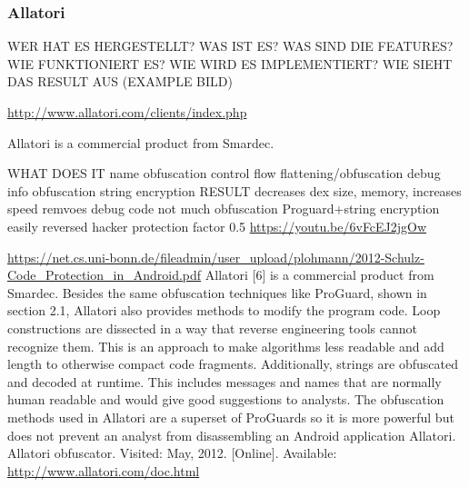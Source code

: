 \subsubsection{Allatori} \label{subsubsection:counter-reengineering-optobf-allatori}

WER HAT ES HERGESTELLT? WAS IST ES? WAS SIND DIE FEATURES? WIE FUNKTIONIERT ES? WIE WIRD ES IMPLEMENTIERT? WIE SIEHT DAS RESULT AUS (EXAMPLE BILD)\newline

\url{http://www.allatori.com/clients/index.php}\newline

Allatori is a commercial product from Smardec.

WHAT DOES IT\newline
name obfuscation\newline
control flow flattening/obfuscation\newline
debug info obfuscation\newline
string encryption\newline
RESULT\newline
decreases dex size, memory, increases speed\newline
remvoes debug code\newline
not much obfuscation\newline
Proguard+string encryption\newline
easily reversed\newline
hacker protection factor 0.5\newline
\url{https://youtu.be/6vFcEJ2jgOw}


\url{https://net.cs.uni-bonn.de/fileadmin/user_upload/plohmann/2012-Schulz-Code_Protection_in_Android.pdf}\newline
Allatori [6] is a commercial product from Smardec. Besides the same obfuscation techniques
like ProGuard, shown in section 2.1, Allatori also provides methods to modify the
program code. Loop constructions are dissected in a way that reverse engineering tools
cannot recognize them. This is an approach to make algorithms less readable and add
length to otherwise compact code fragments. Additionally, strings are obfuscated and decoded
at runtime. This includes messages and names that are normally human readable
and would give good suggestions to analysts.
The obfuscation methods used in Allatori are a superset of ProGuards so it is more
powerful but does not prevent an analyst from disassembling an Android application\newline
Allatori. Allatori obfuscator. Visited: May, 2012. [Online]. Available: \url{http://www.allatori.com/doc.html}
